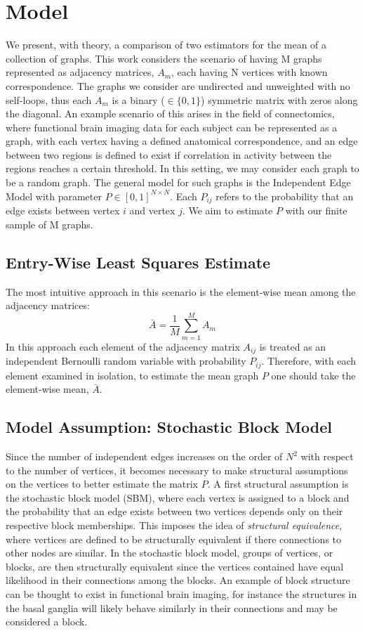 \section{Model}
We present, with theory, a comparison of two estimators for the mean of a collection of graphs.  This work considers the scenario of having M graphs represented as adjacency matrices, $A_m$, each having N vertices with known correspondence.  The graphs we consider are undirected and unweighted with no self-loops, thus each $A_m$ is a binary ($\in \{0,1\}$) symmetric matrix with zeros along the diagonal. An example scenario of this arises in the field of connectomics, where functional brain imaging data for each subject can be represented as a graph, with each vertex having a defined anatomical correspondence, and an edge between two regions is defined to exist if correlation in activity between the regions reaches a certain threshold. In this setting, we may consider each graph to be a random graph.  The general model for such graphs is the Independent Edge Model with parameter $P \in [0,1]^{N\times N}$.  Each $P_{ij}$ refers to the probability that an edge exists between vertex $i$ and vertex $j$. We aim to estimate $P$ with our finite sample of M graphs.

\subsection{Entry-Wise Least Squares Estimate}
The most intuitive approach in this scenario is the element-wise mean among the adjacency matrices:
\begin{equation}
\bar{A} = \frac{1}{M}\sum\limits_{m = 1}^M A_m
\end{equation}
In this approach each element of the adjacency matrix $A_{ij}$ is treated as an independent Bernoulli random variable with probability $P_{ij}$.  Therefore, with each element examined in isolation, to estimate the mean graph $P$ one should take the element-wise mean, $\bar{A}$.

\subsection{Model Assumption: Stochastic Block Model}
Since the number of independent edges increases on the order of $N^2$ with respect to the number of vertices, it becomes necessary to make structural assumptions on the vertices to better estimate the matrix $P$. A first structural assumption is the stochastic block model (SBM), where each vertex is assigned to a block and the probability that an edge exists between two vertices depends only on their respective block memberships.  This imposes the idea of \textit{structural equivalence}, where vertices are defined to be structurally equivalent if there connections to other nodes are similar.  In the stochastic block model, groups of vertices, or blocks, are then structurally equivalent since the vertices contained have equal likelihood in their connections among the blocks.  An example of block structure can be thought to exist in functional brain imaging, for instance the structures in the basal ganglia will likely behave similarly in their connections and may be considered a block.

